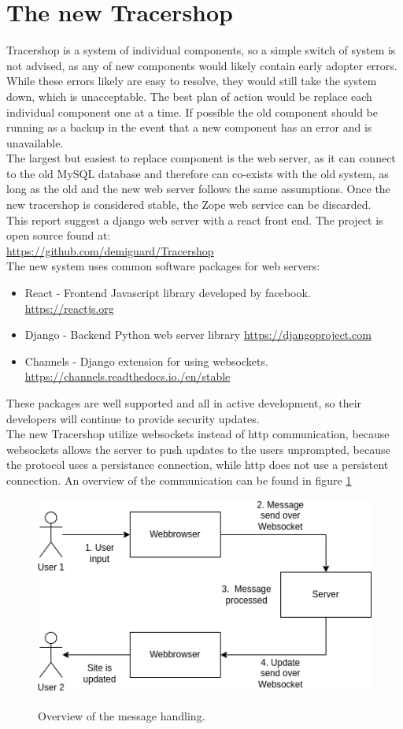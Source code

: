 \documentclass{article}
\begin{document}
\section*{The new Tracershop}
Tracershop is a system of individual components, so a simple switch of system is not advised, as any of new components would likely contain early adopter errors.
While these errors likely are easy to resolve, they would still take the system down, which is unacceptable.
The best plan of action would be replace each individual component one at a time.
If possible the old component should be running as a backup in the event that a new component has an error and is unavailable.\\
The largest but easiest to replace component is the web server, as it can connect to the old MySQL database and therefore can co-exists with the old system,
as long as the old and the new web server follows the same assumptions. Once the new tracershop is considered stable, the Zope web service can be discarded. \\
This report suggest a django web server with a react front end. The project is open source found at:\\
\url{https://github.com/demiguard/Tracershop}\\
The new system uses common software packages for web servers:
\begin{itemize}
  \item React - Frontend Javascript library developed by facebook. \url{https://reactjs.org}
  \item Django - Backend Python web server library \url{https://djangoproject.com}
  \item Channels - Django extension for using websockets. \url{https://channels.readthedocs.io./en/stable}
\end{itemize}
These packages are well supported and all in active development, so their developers will continue to provide security updates.\\
The new Tracershop utilize websockets instead of http communication, because websockets allows the server to push updates to the users unprompted,
because the protocol uses a persistance connection, while http does not use a persistent connection.
An overview of the communication can be found in figure \ref*{fig:websocketMessage}
\begin{figure}[ht]
  \begin{center}
    \includegraphics[width=0.6\linewidth]{websocketMessage.png}
    \label{fig:websocketMessage}
    \caption{Overview of the message handling.}
  \end{center}
\end{figure}
\end{document}
